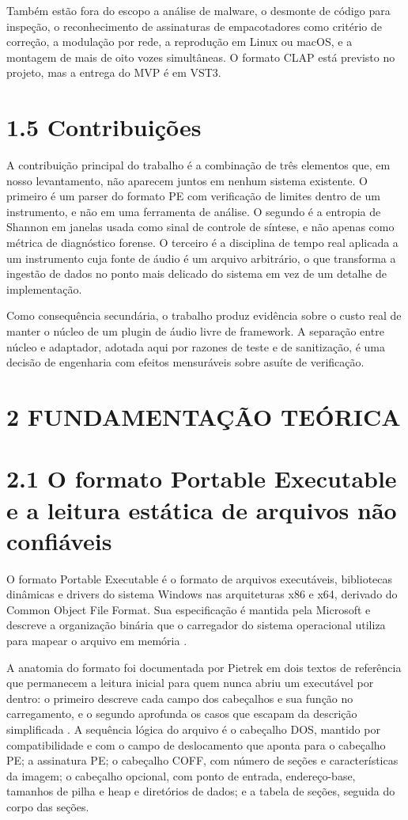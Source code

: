 \documentclass[12pt,a4paper]{article}
\begin{document}
Também estão fora do escopo a análise de malware, o desmonte de código para inspeção, o reconhecimento de assinaturas de empacotadores como critério de correção, a modulação por rede, a reprodução em Linux ou macOS, e a montagem de mais de oito vozes simultâneas. O formato CLAP está previsto no projeto, mas a entrega do MVP é em VST3.


\section*{1.5 Contribuições}

A contribuição principal do trabalho é a combinação de três elementos que, em nosso levantamento, não aparecem juntos em nenhum sistema existente. O primeiro é um parser do formato PE com verificação de limites dentro de um instrumento, e não em uma ferramenta de análise. O segundo é a entropia de Shannon em janelas usada como sinal de controle de síntese, e não apenas como métrica de diagnóstico forense. O terceiro é a disciplina de tempo real aplicada a um instrumento cuja fonte de áudio é um arquivo arbitrário, o que transforma a ingestão de dados no ponto mais delicado do sistema em vez de um detalhe de implementação.


Como consequência secundária, o trabalho produz evidência sobre o custo real de manter o núcleo de um plugin de áudio livre de framework. A separação entre núcleo e adaptador, adotada aqui por razones de teste e de sanitização, é uma decisão de engenharia com efeitos mensuráveis sobre asuíte de verificação.


\section*{2 FUNDAMENTAÇÃO TEÓRICA}

\section*{2.1 O formato Portable Executable e a leitura estática de arquivos não confiáveis}

O formato Portable Executable é o formato de arquivos executáveis, bibliotecas dinâmicas e drivers do sistema Windows nas arquiteturas x86 e x64, derivado do Common Object File Format. Sua especificação é mantida pela Microsoft e descreve a organização binária que o carregador do sistema operacional utiliza para mapear o arquivo em memória \cite{microsoftpe}.


A anatomia do formato foi documentada por Pietrek em dois textos de referência que permanecem a leitura inicial para quem nunca abriu um executável por dentro: o primeiro descreve cada campo dos cabeçalhos e sua função no carregamento, e o segundo aprofunda os casos que escapam da descrição simplificada \cite{pietrek1994, pietrek2002}. A sequência lógica do arquivo é o cabeçalho DOS, mantido por compatibilidade e com o campo de deslocamento que aponta para o cabeçalho PE; a assinatura PE; o cabeçalho COFF, com número de seções e características da imagem; o cabeçalho opcional, com ponto de entrada, endereço-base, tamanhos de pilha e heap e diretórios de dados; e a tabela de seções, seguida do corpo das seções.
\end{document}
